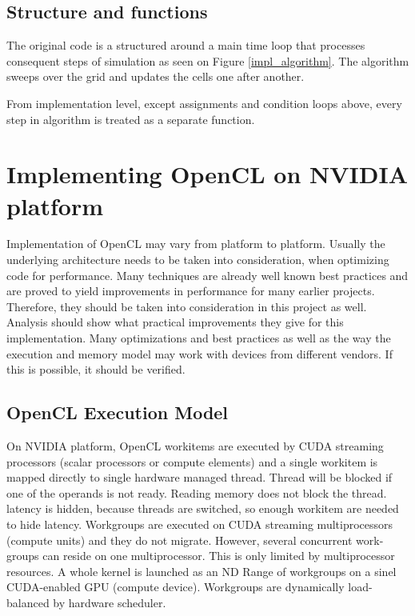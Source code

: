 \subsection{Structure and functions}
The original code is a structured around a main time loop that processes consequent steps of simulation as seen on Figure \ref{impl_algorithm}. The algorithm sweeps over the grid and updates the cells one after another.


From implementation level, except assignments and condition loops above, every step in algorithm is treated as a separate function. 

\section{Implementing OpenCL on NVIDIA platform}
Implementation of OpenCL may vary from platform to platform. Usually the underlying architecture needs to be taken into consideration, when optimizing code for performance. Many techniques are already well known best practices and are proved to yield improvements in performance for many earlier projects. Therefore, they should be taken into consideration in this project as well. Analysis should show what practical improvements they give for this implementation. Many optimizations and best practices as well as the way the execution and memory model may work with devices from different vendors. If this is possible, it should be verified.

\subsection{OpenCL Execution Model}
On NVIDIA platform, OpenCL workitems are executed by CUDA streaming processors (scalar processors or compute elements) and a single workitem is mapped directly to single hardware managed thread. Thread will be blocked if one of the operands is not ready. Reading memory does not block the thread. latency is hidden, because threads are switched, so enough workitem are needed to hide latency. Workgroups are executed on CUDA streaming multiprocessors (compute units) and they do not migrate. However, several concurrent work-groups can reside on one multiprocessor. This is only limited by multiprocessor resources. A whole kernel is launched as an ND Range of workgroups on a sinel CUDA-enabled GPU (compute device). Workgroups are dynamically load-balanced by hardware scheduler. 

